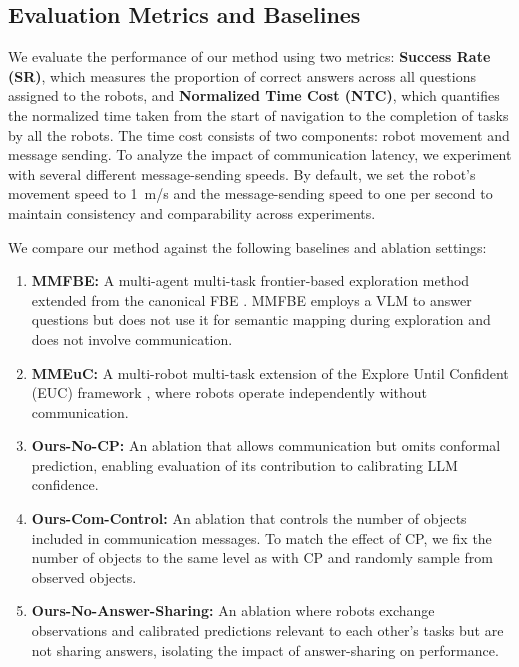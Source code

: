 \subsection{Evaluation Metrics and Baselines}
We evaluate the performance of our method using two metrics: 
\textbf{Success Rate (SR)}, which measures the proportion of correct answers across all questions assigned to the robots, and \textbf{Normalized Time Cost (NTC)}, which quantifies the normalized time taken from the start of navigation to the completion of tasks by all the robots.
The time cost consists of two components: robot movement and message sending. 
To analyze the impact of communication latency, we experiment with several different message-sending speeds. By default, we set the robot's movement speed to \SI{1}{m/s} and the message-sending speed to one per second to maintain consistency and comparability across experiments.


We compare our method against the following baselines and ablation settings:
\begin{enumerate}
    \item \textbf{MMFBE:} A multi-agent multi-task frontier-based exploration method extended from the canonical FBE \cite{yamauchi1997frontier}. MMFBE employs a VLM to answer questions but does not use it for semantic mapping during exploration and does not involve communication.
    \item \textbf{MMEuC:} A multi-robot multi-task extension of the Explore Until Confident (EUC) framework \cite{ren2024explore}, where robots operate independently without communication.
    \item \textbf{Ours-No-CP:} An ablation that allows communication but omits conformal prediction, enabling evaluation of its contribution to calibrating LLM confidence.
    \item \textbf{Ours-Com-Control:} An ablation that controls the number of objects included in communication messages. To match the effect of CP, we fix the number of objects to the same level as with CP and randomly sample from observed objects.
    \item \textbf{Ours-No-Answer-Sharing:} An ablation where robots exchange observations and calibrated predictions relevant to each other's tasks but are not sharing answers, isolating the impact of answer-sharing on performance.
\end{enumerate}

